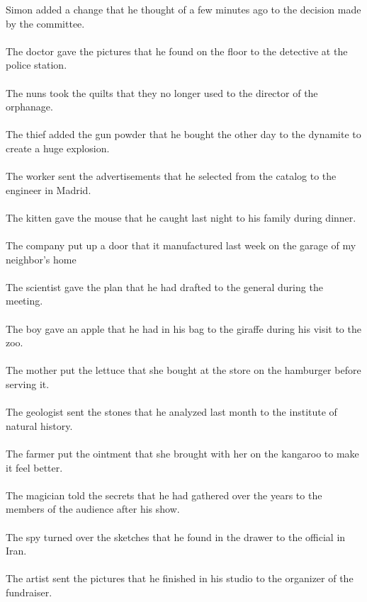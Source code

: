 Simon added a change that he thought of a few minutes ago to the decision made by the committee.	\\	\\
The doctor gave the pictures that he found on the floor to the detective at the police station.	\\	\\
The nuns took the quilts that they no longer used to the director of the orphanage.	\\	\\
The thief added the gun powder that he bought the other day to the dynamite to create a huge explosion.	\\	\\
The worker sent the advertisements that he selected from the catalog to the engineer in Madrid.	\\	\\
The kitten gave the mouse that he caught last night to his family during dinner.	\\	\\
The company put up a door that it manufactured last week on the garage of my neighbor's home	\\	\\
The scientist gave the plan that he had drafted to the general during the meeting.	\\	\\
The boy gave an apple that he had in his bag to the giraffe during his visit to the zoo.	\\	\\
The mother put the lettuce that she bought at the store on the hamburger before serving it.	\\	\\
The geologist sent the stones that he analyzed last month to the institute of natural history.	\\	\\
The farmer put the ointment that she brought with her on the kangaroo to make it feel better.	\\	\\
The magician told the secrets that he had gathered over the years to the members of the audience after his show.	\\	\\
The spy turned over the sketches that he found in the drawer to the official in Iran.	\\	\\
The artist sent the pictures that he finished in his studio to the organizer of the fundraiser.	\\	\\
